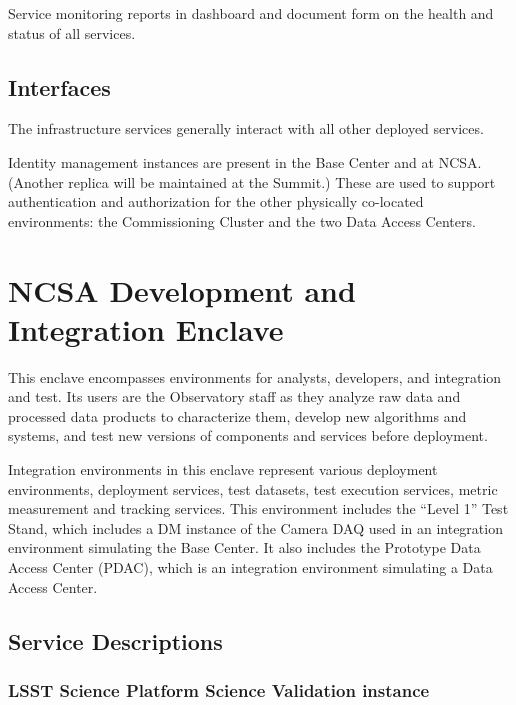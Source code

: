 \documentclass[DM,toc,lsstdraft]{lsstdoc}
\begin{document}
Service monitoring reports in dashboard and document form on the health and status of all services.

\subsection{Interfaces}\label{infrastructure-interfaces}

The infrastructure services generally interact with all other deployed
services.

Identity management instances are present in the Base Center and at NCSA.
(Another replica will be maintained at the Summit.)  These are used to support
authentication and authorization for the other physically co-located environments:
the Commissioning Cluster and the two Data Access Centers.


\section{NCSA Development and Integration Enclave}\label{ncsa-development-integration-enclave}

This enclave encompasses environments for analysts, developers, and
integration and test. Its users are the Observatory staff as they
analyze raw data and processed data products to characterize them,
develop new algorithms and systems, and test new versions of components
and services before deployment.

Integration environments in this enclave represent various deployment environments, deployment services, test datasets, test execution services, metric measurement and tracking services.
This environment includes the ``Level 1'' Test Stand, which includes a DM instance of the Camera DAQ used in an integration environment simulating the Base Center.
It also includes the Prototype Data Access Center (PDAC), which is an integration environment simulating a Data Access Center.

\subsection{Service Descriptions}\label{ncsa-dev-int-service-descriptions}

\subsubsection{LSST Science Platform Science Validation
instance}\label{lsst-science-platform-science-validation-instance}
\end{document}
